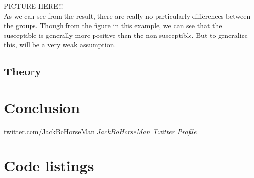 \documentclass[10pt]{IEEEtran}
\begin{document}
PICTURE HERE!!!\\

As we can see from the result, there are really no particularly differences between the groups. Though from the figure in this example, we can see that the susceptible is generally more positive than the non-susceptible. But to generalize this, will be a very weak assumption. 

\subsection{Theory}

\section{Conclusion}





\begin{thebibliography}{9}

\url{twitter.com/JackBoHorseMan}
\textit{JackBoHorseMan Twitter Profile}

\end{thebibliography}

\clearpage
\onecolumn
\appendices
\section{Code listings}

\lstlistoflistings
\end{document}
